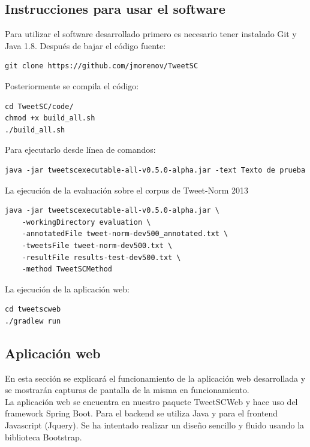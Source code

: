 \documentclass[spanish,12pt, a4paper,twoside]{paper}
\begin{document}
\newpage
\subsection{Instrucciones para usar el software}\label{sec:instruccionesparausarelsoftware}
Para utilizar el software desarrollado primero es necesario tener instalado Git y Java 1.8. Después de bajar el código fuente: 
\begin{verbatim}
git clone https://github.com/jmorenov/TweetSC
\end{verbatim}
Posteriormente se compila el código: 
\begin{verbatim}
cd TweetSC/code/
chmod +x build_all.sh
./build_all.sh
\end{verbatim}
Para ejecutarlo desde línea de comandos:
\begin{verbatim}
java -jar tweetscexecutable-all-v0.5.0-alpha.jar -text Texto de prueba
\end{verbatim}
La ejecución de la evaluación sobre el corpus de Tweet-Norm 2013 \cite{alegria:2013}
\begin{verbatim}
java -jar tweetscexecutable-all-v0.5.0-alpha.jar \
    -workingDirectory evaluation \
    -annotatedFile tweet-norm-dev500_annotated.txt \
    -tweetsFile tweet-norm-dev500.txt \
    -resultFile results-test-dev500.txt \
    -method TweetSCMethod
\end{verbatim}
La ejecución de la aplicación web:
\begin{verbatim}
cd tweetscweb
./gradlew run
\end{verbatim}

\subsection{Aplicación web}\label{sec:aplicacionweb}
En esta sección se explicará el funcionamiento de la aplicación web desarrollada y se mostrarán capturas de pantalla de la misma en funcionamiento.\\

La aplicación web se encuentra en nuestro paquete TweetSCWeb y hace uso del framework Spring Boot. Para el backend se utiliza Java y para el frontend Javascript (Jquery). Se ha intentado realizar un diseño sencillo y fluido usando la biblioteca Bootstrap.\\
\end{document}
